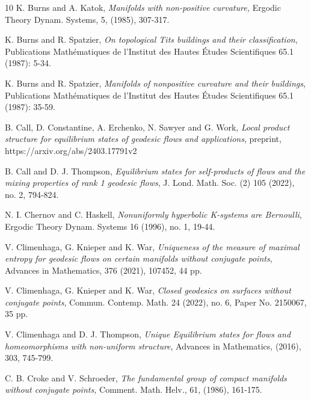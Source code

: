 \documentclass[11pt]{amsart}
\theoremstyle{definition}
\begin{document}
\begin{thebibliography}{10}
K. Burns and A. Katok, \emph {Manifolds with non-positive curvature,} Ergodic Theory Dynam. Systems, 5, (1985), 307-317.


K. Burns and R. Spatzier, \emph{On topological Tits buildings and their classification}, Publications Math\'{e}matiques de l'Institut des Hautes \'{E}tudes Scientifiques 65.1 (1987): 5-34.

K. Burns and R. Spatzier, \emph{Manifolds of nonpositive curvature and their buildings}, Publications Math\'{e}matiques de l'Institut des Hautes \'{E}tudes Scientifiques 65.1 (1987): 35-59.


B. Call, D. Constantine, A. Erchenko, N. Sawyer and G. Work, \emph{Local product structure for equilibrium states of geodesic flows and applications}, preprint, https://arxiv.org/abs/2403.17791v2

B. Call and D. J. Thompson, \emph{Equilibrium states for self-products of flows and the mixing properties of rank 1 geodesic flows}, J. Lond. Math. Soc. (2) 105 (2022), no. 2, 794-824.



N. I. Chernov and C. Haskell, \emph{Nonuniformly hyperbolic K-systems are Bernoulli}, Ergodic
Theory Dynam. Systems 16 (1996), no. 1, 19-44.

 V. Climenhaga, G. Knieper and K. War, \emph{Uniqueness of the measure of maximal entropy for geodesic flows on certain manifolds without conjugate points}, Advances in Mathematics, 376 (2021), 107452, 44 pp.

V. Climenhaga, G. Knieper and K. War, \emph{Closed geodesics on surfaces without conjugate points}, Commun. Contemp. Math. 24 (2022), no. 6, Paper No. 2150067, 35 pp.

V. Climenhaga and D. J. Thompson, \emph{Unique Equilibrium states for flows and homeomorphisms with non-uniform structure}, Advances in Mathematics, (2016), 303, 745-799.

C. B. Croke and V. Schroeder, \emph {The fundamental group of compact manifolds without conjugate points,} Comment. Math. Helv., 61, (1986), 161-175.



\end{thebibliography}
\end{document}
